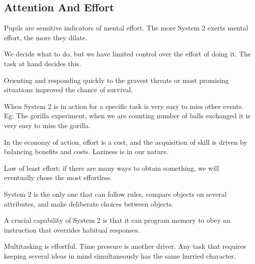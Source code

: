 \subsection*{Attention And Effort}
\bit
\item Pupils are sensitive indicators of mental effort. The more System 2 exerts mental effort, the more they dilate.
\item We decide what to do, but we have limited control over the effort of doing it. The task at hand decides this.
\item Orienting and responding quickly to the gravest threats or most promising situations improved the chance of
survival.
\item When System 2 is in action for a specific task is very easy to miss other events. Eg: The gorilla experiment,
when we are counting number of balls exchanged it is very easy to miss the gorilla.
\item In the economy of action, effort is a cost, and the acquisition of skill is driven by balancing benefits and
costs. Laziness is in our nature.
\item Law of least effort: if there are many ways to obtain something, we will eventually chose the most effortless.
\item System 2 is the only one that can follow rules, compare objects on several attributes, and make deliberate
choices between objects.
\item A crucial capability of System 2 is that it can program memory to obey an instruction that overrides habitual
responses.
\item Multitasking is effortful. Time pressure is another driver. Any task that requires keeping several ideas in
mind simultaneously has the same hurried character.
\eit


